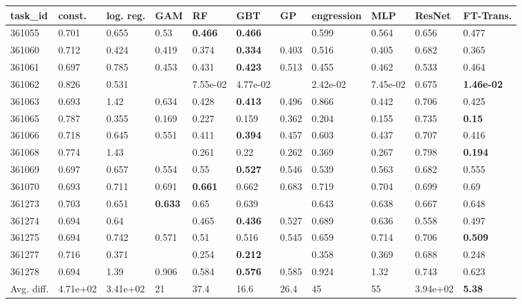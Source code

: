 \begin{table}[ht!]
\centering
\begingroup\footnotesize
\begin{tabular}{lllllllllll}
  \hline
\hline
task\_id & const. & log. reg. & GAM & RF & GBT & GP & engression & MLP & ResNet & FT-Trans. \\ 
  \hline
361055 & 0.701 & 0.655 & 0.53 & \textbf{0.466} & \textbf{0.466} &  & 0.599 & 0.564 & 0.656 & 0.477 \\ 
  361060 & 0.712 & 0.424 & 0.419 & 0.374 & \textbf{0.334} & 0.403 & 0.516 & 0.405 & 0.682 & 0.365 \\ 
  361061 & 0.697 & 0.785 & 0.453 & 0.431 & \textbf{0.423} & 0.513 & 0.455 & 0.462 & 0.533 & 0.464 \\ 
  361062 & 0.826 & 0.531 &  & 7.55e-02 & 4.77e-02 &  & 2.42e-02 & 7.45e-02 & 0.675 & \textbf{1.46e-02} \\ 
  361063 & 0.693 & 1.42 & 0.634 & 0.428 & \textbf{0.413} & 0.496 & 0.866 & 0.442 & 0.706 & 0.425 \\ 
  361065 & 0.787 & 0.355 & 0.169 & 0.227 & 0.159 & 0.362 & 0.204 & 0.155 & 0.735 & \textbf{0.15} \\ 
  361066 & 0.718 & 0.645 & 0.551 & 0.411 & \textbf{0.394} & 0.457 & 0.603 & 0.437 & 0.707 & 0.416 \\ 
  361068 & 0.774 & 1.43 &  & 0.261 & 0.22 & 0.262 & 0.369 & 0.267 & 0.798 & \textbf{0.194} \\ 
  361069 & 0.697 & 0.657 & 0.554 & 0.55 & \textbf{0.527} & 0.546 & 0.539 & 0.563 & 0.682 & 0.555 \\ 
  361070 & 0.693 & 0.711 & 0.691 & \textbf{0.661} & 0.662 & 0.683 & 0.719 & 0.704 & 0.699 & 0.69 \\ 
  361273 & 0.703 & 0.651 & \textbf{0.633} & 0.65 & 0.639 &  & 0.643 & 0.638 & 0.667 & 0.648 \\ 
  361274 & 0.694 & 0.64 &  & 0.465 & \textbf{0.436} & 0.527 & 0.689 & 0.636 & 0.558 & 0.497 \\ 
  361275 & 0.694 & 0.742 & 0.571 & 0.51 & 0.516 & 0.545 & 0.659 & 0.714 & 0.706 & \textbf{0.509} \\ 
  361277 & 0.716 & 0.371 &  & 0.254 & \textbf{0.212} &  & 0.358 & 0.369 & 0.688 & 0.248 \\ 
  361278 & 0.694 & 1.39 & 0.906 & 0.584 & \textbf{0.576} & 0.585 & 0.924 & 1.32 & 0.743 & 0.623 \\ 
   \hline
Avg. diff. & 4.71e+02 & 3.41e+02 & 21 & 37.4 & 16.6 & 26.4 & 45 & 55 & 3.94e+02 & \textbf{5.38} \\ 

\end{tabular}
\end{table}
